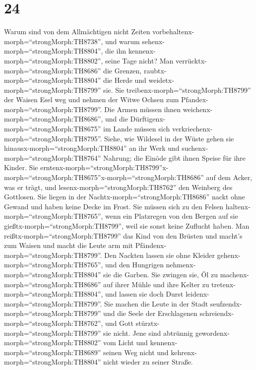 \hypertarget{section-23}{%
\section{24}\label{section-23}}

 Warum sind von dem Allmächtigen nicht Zeiten
vorbehaltenx-morph=``strongMorph:TH8738'', und warum
sehenx-morph=``strongMorph:TH8804'', die ihn
kennenx-morph=``strongMorph:TH8802'', seine Tage nicht?  Man
verrücktx-morph=``strongMorph:TH8686'' die Grenzen,
raubtx-morph=``strongMorph:TH8804'' die Herde und
weidetx-morph=``strongMorph:TH8799'' sie.  Sie
treibenx-morph=``strongMorph:TH8799'' der Waisen Esel weg und nehmen der
Witwe Ochsen zum Pfandex-morph=``strongMorph:TH8799''.  Die
Armen müssen ihnen weichenx-morph=``strongMorph:TH8686'', und die
Dürftigenx-morph=``strongMorph:TH8675'' im Lande müssen sich
verkriechenx-morph=``strongMorph:TH8795''.  Siehe, wie
Wildesel in der Wüste gehen sie hinausx-morph=``strongMorph:TH8804'' an
ihr Werk und suchenx-morph=``strongMorph:TH8764'' Nahrung; die Einöde
gibt ihnen Speise für ihre Kinder.  Sie
erntenx-morph=``strongMorph:TH8799''\textbar x-morph=``strongMorph:TH8675''x-morph=``strongMorph:TH8686''
auf dem Acker, was er trägt, und lesenx-morph=``strongMorph:TH8762'' den
Weinberg des Gottlosen.  Sie liegen in der
Nachtx-morph=``strongMorph:TH8686'' nackt ohne Gewand und haben keine
Decke im Frost.  Sie müssen sich zu den Felsen
haltenx-morph=``strongMorph:TH8765'', wenn ein Platzregen von den Bergen
auf sie gießtx-morph=``strongMorph:TH8799'', weil sie sonst keine
Zuflucht haben.  Man reißtx-morph=``strongMorph:TH8799'' das
Kind von den Brüsten und macht's zum Waisen und macht die Leute arm mit
Pfändenx-morph=``strongMorph:TH8799''.  Den Nackten lassen
sie ohne Kleider gehenx-morph=``strongMorph:TH8765'', und den Hungrigen
nehmenx-morph=``strongMorph:TH8804'' sie die Garben.  Sie
zwingen sie, Öl zu machenx-morph=``strongMorph:TH8686'' auf ihrer Mühle
und ihre Kelter zu tretenx-morph=``strongMorph:TH8804'', und lassen sie
doch Durst leidenx-morph=``strongMorph:TH8799''.  Sie
machen die Leute in der Stadt seufzendx-morph=``strongMorph:TH8799'' und
die Seele der Erschlagenen schreiendx-morph=``strongMorph:TH8762'', und
Gott stürztx-morph=``strongMorph:TH8799'' sie nicht.  Jene
sind abtrünnig gewordenx-morph=``strongMorph:TH8802'' vom Licht und
kennenx-morph=``strongMorph:TH8689'' seinen Weg nicht und
kehrenx-morph=``strongMorph:TH8804'' nicht wieder zu seiner Straße.
